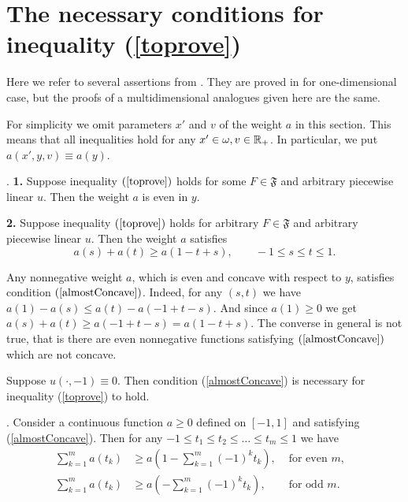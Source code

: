\section{The necessary conditions for inequality (\ref{toprove})}

Here we refer to several assertions from \cite{1dim}.
They are proved in \cite{1dim} for one-dimensional case, but the proofs of a multidimensional analogues given here are the same.

For simplicity we omit parameters $x'$ and $v$ of the weight $a$ in this section.
This means that all inequalities hold for any $x' \in \omega, v \in \mathbb R_+$.
In particular, we put $a( x', y, v ) \equiv a( y )$.

\begin{prop}
{\rm \cite[Theorem 1]{1dim}.}
{\bf 1.} Suppose inequality $(\ref{toprove})$ holds for some $F \in \mathfrak{F}$
and arbitrary piecewise linear $u$.
Then the weight $a$ is even in $y$.

{\bf 2.} Suppose inequality $(\ref{toprove})$ holds for arbitrary $F \in \mathfrak{F}$
and arbitrary piecewise linear $u$.
Then the weight $a$ satisfies
\begin{equation}
\label{almostConcave}
a( s ) + a( t ) \ge a( 1 - t + s ), \qquad -1 \le s \le t \le 1.
\end{equation}
\end{prop}

\begin{rem}
Any nonnegative weight $a$, which is even and concave with respect to $y$, satisfies condition $(\ref{almostConcave})$.
Indeed, for any $(s, t)$ we have $a( 1 ) - a( s ) \le a( t ) - a( -1 + t - s )$.
And since $a( 1 ) \ge 0$ we get $a( s ) + a( t ) \ge a( -1 + t - s ) = a( 1 - t + s )$.
The converse in general is not true, that is there are even nonnegative functions satisfying $(\ref{almostConcave})$ which are not concave.
\end{rem}

\begin{rem}
\label{lanNec}
Suppose $u(\cdot, -1) \equiv 0$.
Then condition (\ref{almostConcave}) is necessary for inequality (\ref{toprove}) to hold.
\end{rem}

\begin{prop}
\label{weightSum}
{\rm \cite[Lemma 1]{1dim}.}
Consider a continuous function $a \ge 0$ defined on $[-1,1]$
and satisfying (\ref{almostConcave}).
Then for any $-1 \le t_1 \le t_2 \le \ldots \le t_m \le 1$ we have
\begin{align*}
\sum_{k=1}^m a(t_k) & \ge a( 1 - \sum_{k = 1}^m (-1)^k t_k ), & \text{ for even $m$},&\\
\sum_{k=1}^m a(t_k) & \ge a( -\sum_{k = 1}^m (-1)^k t_k ),    & \text{ for odd $m$}.&
\end{align*}
\end{prop}

